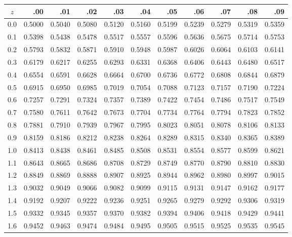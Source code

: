 \begin{center}
\scriptsize
\setlength{\tabcolsep}{3.2pt}
\begin{tabular}{c*{10}{r}}
\toprule
$z$ & .00 & .01 & .02 & .03 & .04 & .05 & .06 & .07 & .08 & .09 \\
\midrule
0.0 & 0.5000 & 0.5040 & 0.5080 & 0.5120 & 0.5160 & 0.5199 & 0.5239 & 0.5279 & 0.5319 & 0.5359 \\
0.1 & 0.5398 & 0.5438 & 0.5478 & 0.5517 & 0.5557 & 0.5596 & 0.5636 & 0.5675 & 0.5714 & 0.5753 \\
0.2 & 0.5793 & 0.5832 & 0.5871 & 0.5910 & 0.5948 & 0.5987 & 0.6026 & 0.6064 & 0.6103 & 0.6141 \\
0.3 & 0.6179 & 0.6217 & 0.6255 & 0.6293 & 0.6331 & 0.6368 & 0.6406 & 0.6443 & 0.6480 & 0.6517 \\
0.4 & 0.6554 & 0.6591 & 0.6628 & 0.6664 & 0.6700 & 0.6736 & 0.6772 & 0.6808 & 0.6844 & 0.6879 \\
0.5 & 0.6915 & 0.6950 & 0.6985 & 0.7019 & 0.7054 & 0.7088 & 0.7123 & 0.7157 & 0.7190 & 0.7224 \\
0.6 & 0.7257 & 0.7291 & 0.7324 & 0.7357 & 0.7389 & 0.7422 & 0.7454 & 0.7486 & 0.7517 & 0.7549 \\
0.7 & 0.7580 & 0.7611 & 0.7642 & 0.7673 & 0.7704 & 0.7734 & 0.7764 & 0.7794 & 0.7823 & 0.7852 \\
0.8 & 0.7881 & 0.7910 & 0.7939 & 0.7967 & 0.7995 & 0.8023 & 0.8051 & 0.8078 & 0.8106 & 0.8133 \\
0.9 & 0.8159 & 0.8186 & 0.8212 & 0.8238 & 0.8264 & 0.8289 & 0.8315 & 0.8340 & 0.8365 & 0.8389 \\
1.0 & 0.8413 & 0.8438 & 0.8461 & 0.8485 & 0.8508 & 0.8531 & 0.8554 & 0.8577 & 0.8599 & 0.8621 \\
1.1 & 0.8643 & 0.8665 & 0.8686 & 0.8708 & 0.8729 & 0.8749 & 0.8770 & 0.8790 & 0.8810 & 0.8830 \\
1.2 & 0.8849 & 0.8869 & 0.8888 & 0.8907 & 0.8925 & 0.8944 & 0.8962 & 0.8980 & 0.8997 & 0.9015 \\
1.3 & 0.9032 & 0.9049 & 0.9066 & 0.9082 & 0.9099 & 0.9115 & 0.9131 & 0.9147 & 0.9162 & 0.9177 \\
1.4 & 0.9192 & 0.9207 & 0.9222 & 0.9236 & 0.9251 & 0.9265 & 0.9279 & 0.9292 & 0.9306 & 0.9319 \\
1.5 & 0.9332 & 0.9345 & 0.9357 & 0.9370 & 0.9382 & 0.9394 & 0.9406 & 0.9418 & 0.9429 & 0.9441 \\
1.6 & 0.9452 & 0.9463 & 0.9474 & 0.9484 & 0.9495 & 0.9505 & 0.9515 & 0.9525 & 0.9535 & 0.9545 \\

\end{tabular}
\end{center}
